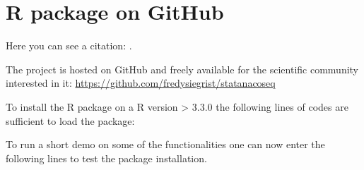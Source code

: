 \chapter{R package on GitHub}
Here you can see a citation: \cite{atc13}.

The project is hosted on GitHub and freely available for the scientific community interested in it:
\href{https://github.com/fredysiegrist/statanacoseq}{https://github.com/fredysiegrist/statanacoseq}


To install the R package on a R version > 3.3.0 the following lines of codes are sufficient to load the package:

  

To run a short demo on some of the functionalities one can now enter the following lines to test the package installation.

  